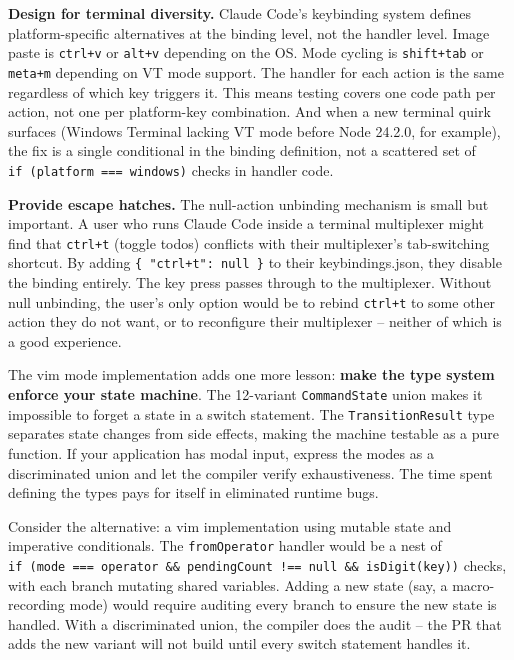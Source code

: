 \documentclass[
  english,
  11pt,
  letterpaper,
]{book}
\begin{document}
\textbf{Design for terminal diversity.} Claude Code's keybinding system
defines platform-specific alternatives at the binding level, not the
handler level. Image paste is \texttt{ctrl+v} or \texttt{alt+v}
depending on the OS. Mode cycling is \texttt{shift+tab} or
\texttt{meta+m} depending on VT mode support. The handler for each
action is the same regardless of which key triggers it. This means
testing covers one code path per action, not one per platform-key
combination. And when a new terminal quirk surfaces (Windows Terminal
lacking VT mode before Node 24.2.0, for example), the fix is a single
conditional in the binding definition, not a scattered set of
\texttt{if\ (platform\ ===\ \textquotesingle{}windows\textquotesingle{})}
checks in handler code.

\textbf{Provide escape hatches.} The null-action unbinding mechanism is
small but important. A user who runs Claude Code inside a terminal
multiplexer might find that \texttt{ctrl+t} (toggle todos) conflicts
with their multiplexer's tab-switching shortcut. By adding
\texttt{\{\ "ctrl+t":\ null\ \}} to their keybindings.json, they disable
the binding entirely. The key press passes through to the multiplexer.
Without null unbinding, the user's only option would be to rebind
\texttt{ctrl+t} to some other action they do not want, or to reconfigure
their multiplexer -- neither of which is a good experience.

The vim mode implementation adds one more lesson: \textbf{make the type
system enforce your state machine}. The 12-variant \texttt{CommandState}
union makes it impossible to forget a state in a switch statement. The
\texttt{TransitionResult} type separates state changes from side
effects, making the machine testable as a pure function. If your
application has modal input, express the modes as a discriminated union
and let the compiler verify exhaustiveness. The time spent defining the
types pays for itself in eliminated runtime bugs.

Consider the alternative: a vim implementation using mutable state and
imperative conditionals. The \texttt{fromOperator} handler would be a
nest of
\texttt{if\ (mode\ ===\ \textquotesingle{}operator\textquotesingle{}\ \&\&\ pendingCount\ !==\ null\ \&\&\ isDigit(key))}
checks, with each branch mutating shared variables. Adding a new state
(say, a macro-recording mode) would require auditing every branch to
ensure the new state is handled. With a discriminated union, the
compiler does the audit -- the PR that adds the new variant will not
build until every switch statement handles it.
\end{document}
